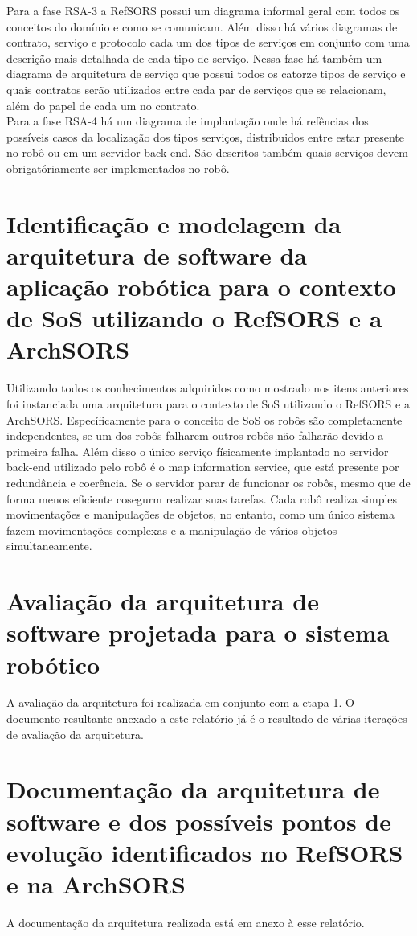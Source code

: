 \documentclass{article}
\begin{document}
Para a fase RSA-3 a RefSORS possui um diagrama informal geral com todos os conceitos do domínio e como se comunicam. Além disso há vários diagramas de contrato, serviço e protocolo cada um dos tipos de serviços em conjunto com uma descrição mais detalhada de cada tipo de serviço. Nessa fase há também um diagrama de arquitetura de serviço que possui todos os catorze tipos de serviço e quais contratos serão utilizados entre cada par de serviços que se relacionam, além do papel de cada um no contrato.\\
Para a fase RSA-4 há um diagrama de implantação onde há refências dos possíveis casos da localização dos tipos serviços, distribuidos entre estar presente no robô ou em um servidor back-end. São descritos também quais serviços devem obrigatóriamente ser implementados no robô.  

\section{Identificação e modelagem da arquitetura de software da aplicação robótica para o contexto de SoS utilizando o RefSORS e a ArchSORS}\label{identificacao}
Utilizando todos os conhecimentos adquiridos como mostrado nos itens anteriores foi instanciada uma arquitetura para o contexto de SoS utilizando o RefSORS e a ArchSORS. Específicamente para o conceito de SoS os robôs são completamente independentes, se um dos robôs falharem outros robôs não falharão devido a primeira falha. Além disso o único serviço físicamente implantado no servidor back-end utilizado pelo robô é o map information service, que está presente por redundância e coerência. Se o servidor parar de funcionar os robôs, mesmo que de forma menos eficiente cosegurm realizar suas tarefas. Cada robô realiza simples movimentações e manipulações de objetos, no entanto, como um único sistema fazem movimentações complexas e a manipulação de vários objetos simultaneamente. 

\section{Avaliação da arquitetura de software projetada para o sistema robótico}
A avaliação da arquitetura foi realizada em conjunto com a etapa \ref{identificacao}. O documento resultante anexado a este relatório já é o resultado de várias iterações de avaliação da arquitetura. 

\section{Documentação da arquitetura de software e dos possíveis pontos de evolução identificados no RefSORS e na ArchSORS}
A documentação da arquitetura realizada está em anexo à esse relatório.
\end{document}

